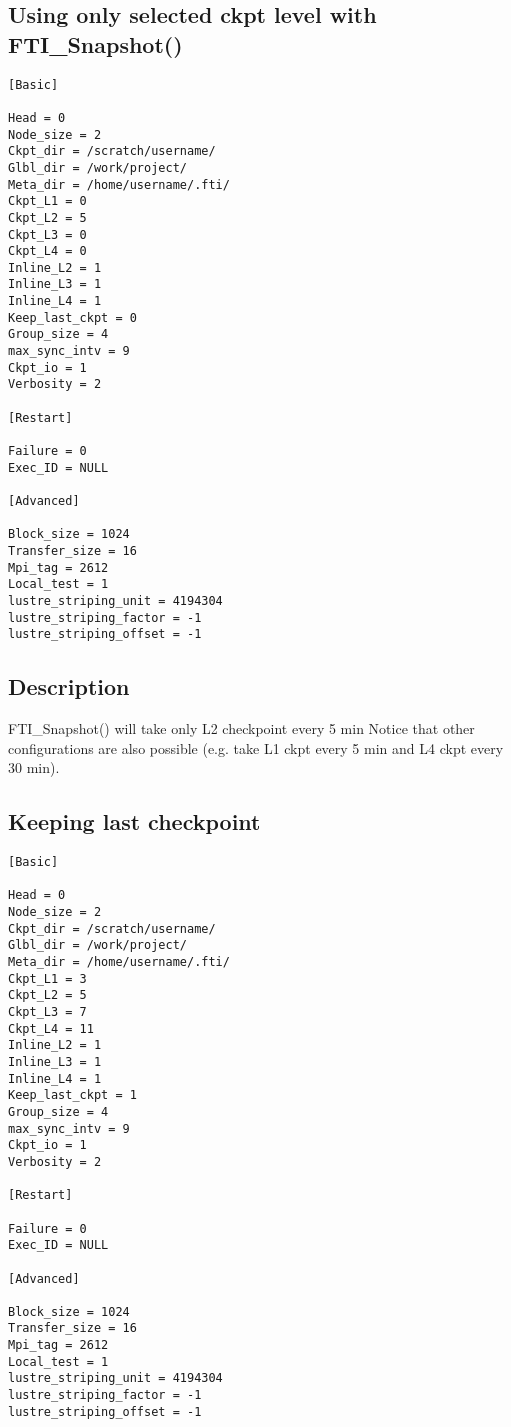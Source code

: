 \documentclass{refrep}
\begin{document}
\subsection{Using only selected ckpt level with FTI\_Snapshot()}\label{subsec:configoneckptlvl}
\begin{center}
\begin{lstlisting}[frame=single]
[Basic]

Head = 0
Node_size = 2
Ckpt_dir = /scratch/username/
Glbl_dir = /work/project/
Meta_dir = /home/username/.fti/
Ckpt_L1 = 0
Ckpt_L2 = 5
Ckpt_L3 = 0
Ckpt_L4 = 0
Inline_L2 = 1
Inline_L3 = 1
Inline_L4 = 1
Keep_last_ckpt = 0
Group_size = 4
max_sync_intv = 9
Ckpt_io = 1
Verbosity = 2

[Restart]

Failure = 0
Exec_ID = NULL

[Advanced]

Block_size = 1024
Transfer_size = 16
Mpi_tag = 2612
Local_test = 1
lustre_striping_unit = 4194304 
lustre_striping_factor = -1 
lustre_striping_offset = -1 

\end{lstlisting}
\end{center}
\subsection*{Description}
FTI\_Snapshot() will take only L2 checkpoint every 5 min Notice that other configurations are also possible (e.g. take L1 ckpt every 5 min and L4 ckpt every 30 min).
\newpage
\subsection{Keeping last checkpoint}\label{subsec:configkeeplastckpt}
\begin{center}
\begin{lstlisting}[frame=single]
[Basic]

Head = 0
Node_size = 2
Ckpt_dir = /scratch/username/
Glbl_dir = /work/project/
Meta_dir = /home/username/.fti/
Ckpt_L1 = 3
Ckpt_L2 = 5
Ckpt_L3 = 7
Ckpt_L4 = 11
Inline_L2 = 1
Inline_L3 = 1
Inline_L4 = 1
Keep_last_ckpt = 1
Group_size = 4
max_sync_intv = 9
Ckpt_io = 1
Verbosity = 2

[Restart]

Failure = 0
Exec_ID = NULL

[Advanced]

Block_size = 1024
Transfer_size = 16
Mpi_tag = 2612
Local_test = 1
lustre_striping_unit = 4194304 
lustre_striping_factor = -1 
lustre_striping_offset = -1 

\end{lstlisting}
\end{center}
\end{document}
